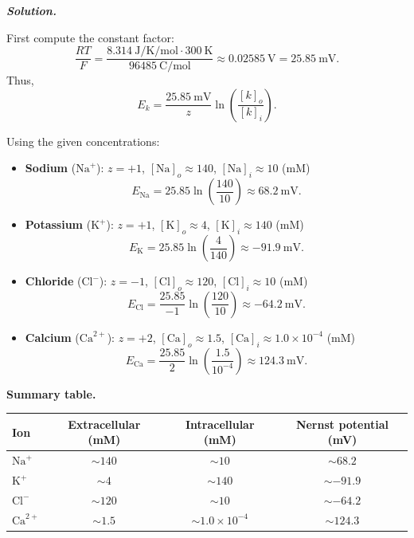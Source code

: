 \documentclass{article}
\newif\ifsolutionclearpage
\newenvironment{solution}{%
    \ifsolutionclearpage\clearpage\fi
    \global\solutionclearpagetrue
    \par\noindent\begin{solutionbox}\textbf{\textit{Solution.}}\par\medskip\itshape
}{%
    \end{solutionbox}
}
\begin{document}
\begin{solution}
First compute the constant factor:
\[
\frac{RT}{F}=\frac{\SI{8.314}{\joule\per\kelvin\per\mole}\cdot\SI{300}{\kelvin}}{\SI{96485}{\coulomb\per\mole}}\approx \SI{0.02585}{\volt}=\SI{25.85}{\milli\volt}.
\]
Thus,
\[
E_k=\frac{\SI{25.85}{\milli\volt}}{z}\ln\left(\frac{[k]_o}{[k]_i}\right).
\]

Using the given concentrations:
\begin{itemize}
\item \textbf{Sodium} ($\mathrm{Na}^+$): $z=+1$, $[\mathrm{Na}]_o\approx 140$, $[\mathrm{Na}]_i\approx 10$ (mM)
\[
E_{\mathrm{Na}}=25.85\ln\left(\frac{140}{10}\right)\approx \SI{68.2}{\milli\volt}.
\]

\item \textbf{Potassium} ($\mathrm{K}^+$): $z=+1$, $[\mathrm{K}]_o\approx 4$, $[\mathrm{K}]_i\approx 140$ (mM)
\[
E_{\mathrm{K}}=25.85\ln\left(\frac{4}{140}\right)\approx \SI{-91.9}{\milli\volt}.
\]

\item \textbf{Chloride} ($\mathrm{Cl}^-$): $z=-1$, $[\mathrm{Cl}]_o\approx 120$, $[\mathrm{Cl}]_i\approx 10$ (mM)
\[
E_{\mathrm{Cl}}=\frac{25.85}{-1}\ln\left(\frac{120}{10}\right)\approx \SI{-64.2}{\milli\volt}.
\]

\item \textbf{Calcium} ($\mathrm{Ca}^{2+}$): $z=+2$, $[\mathrm{Ca}]_o\approx 1.5$, $[\mathrm{Ca}]_i\approx 1.0\times10^{-4}$ (mM)
\[
E_{\mathrm{Ca}}=\frac{25.85}{2}\ln\left(\frac{1.5}{10^{-4}}\right)\approx \SI{124.3}{\milli\volt}.
\]
\end{itemize}

\textbf{Summary table.}
\begin{table}[H]
\centering
\begin{tabular}{lccc}
\toprule
Ion & Extracellular (mM) & Intracellular (mM) & Nernst potential (mV)\\
\midrule
$\mathrm{Na}^+$ & $\sim 140$ & $\sim 10$ & $\sim 68.2$\\
$\mathrm{K}^+$ & $\sim 4$ & $\sim 140$ & $\sim -91.9$\\
$\mathrm{Cl}^-$ & $\sim 120$ & $\sim 10$ & $\sim -64.2$\\
$\mathrm{Ca}^{2+}$ & $\sim 1.5$ & $\sim 1.0\times10^{-4}$ & $\sim 124.3$\\
\bottomrule
\end{tabular}
\end{table}
\end{solution}
\end{document}
